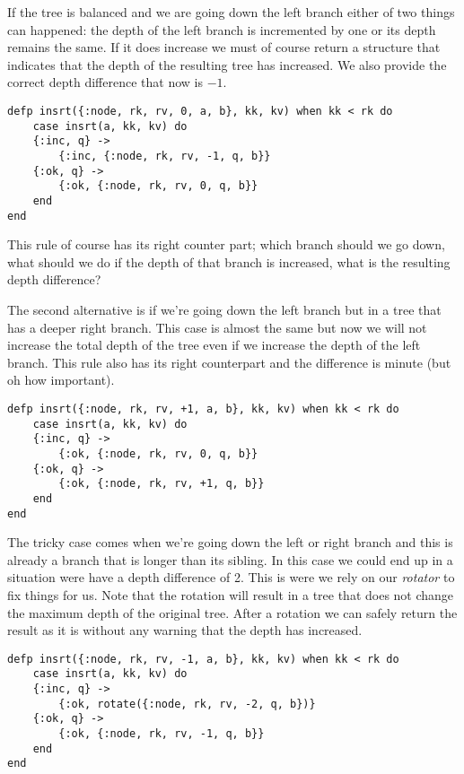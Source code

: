 \documentclass[a4paper,11pt]{article}
\begin{document}
If the tree is balanced and we are going down the left branch either
of two things can happened: the depth of the left branch is incremented
by one or its depth remains the same. If it does increase we must of
course return a structure that indicates that the depth of the
resulting tree has increased. We also provide the correct depth
difference that now is $-1$.

\begin{verbatim}
defp insrt({:node, rk, rv, 0, a, b}, kk, kv) when kk < rk do
    case insrt(a, kk, kv) do
    {:inc, q} ->
        {:inc, {:node, rk, rv, -1, q, b}}
    {:ok, q} ->
        {:ok, {:node, rk, rv, 0, q, b}}
    end
end
\end{verbatim}

This rule of course has its right counter part; which branch should we
go down, what should we do if the depth of that branch is increased,
what is the resulting depth difference?

The second alternative is if we're going down the left branch but in a
tree that has a deeper right branch. This case is almost the same but
now we will not increase the total depth of the tree even if we
increase the depth of the left branch. This rule also has its
right counterpart and the difference is minute (but oh how important).

\begin{verbatim}
defp insrt({:node, rk, rv, +1, a, b}, kk, kv) when kk < rk do
    case insrt(a, kk, kv) do
    {:inc, q} ->
        {:ok, {:node, rk, rv, 0, q, b}}
    {:ok, q} ->
        {:ok, {:node, rk, rv, +1, q, b}}
    end
end
\end{verbatim}

The tricky case comes when we're going down the left or right branch
and this is already a branch that is longer than its sibling. In this
case we could end up in a situation were have a depth difference of
2. This is were we rely on our {\em rotator} to fix things for us. 
Note that
the rotation will result in a tree that does not change the maximum
depth of the original tree. After a rotation we can safely return the
result as it is without any warning that the depth has increased.

\begin{verbatim}
defp insrt({:node, rk, rv, -1, a, b}, kk, kv) when kk < rk do
    case insrt(a, kk, kv) do
    {:inc, q} ->
        {:ok, rotate({:node, rk, rv, -2, q, b})}
    {:ok, q} ->
        {:ok, {:node, rk, rv, -1, q, b}}
    end
end
\end{verbatim}
\end{document}
